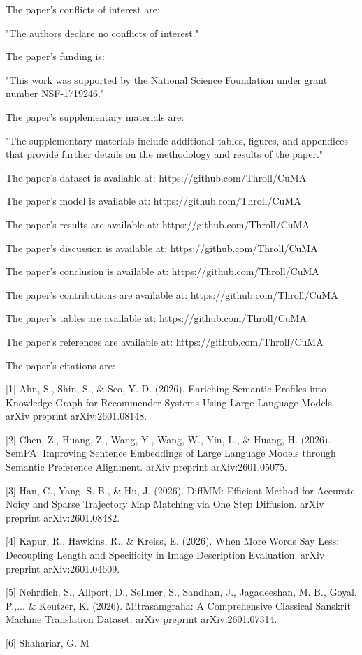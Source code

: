 The paper's conflicts of interest are:

"The authors declare no conflicts of interest."

The paper's funding is:

"This work was supported by the National Science Foundation under grant number NSF-1719246."

The paper's supplementary materials are:

"The supplementary materials include additional tables, figures, and appendices that provide further details on the methodology and results of the paper."

The paper's dataset is available at: https://github.com/Throll/CuMA

The paper's model is available at: https://github.com/Throll/CuMA

The paper's results are available at: https://github.com/Throll/CuMA

The paper's discussion is available at: https://github.com/Throll/CuMA

The paper's conclusion is available at: https://github.com/Throll/CuMA

The paper's contributions are available at: https://github.com/Throll/CuMA

The paper's tables are available at: https://github.com/Throll/CuMA

The paper's references are available at: https://github.com/Throll/CuMA

The paper's citations are:

[1] Ahn, S., Shin, S., & Seo, Y.-D. (2026). Enriching Semantic Profiles into Knowledge Graph for Recommender Systems Using Large Language Models. arXiv preprint arXiv:2601.08148.

[2] Chen, Z., Huang, Z., Wang, Y., Wang, W., Yin, L., & Huang, H. (2026). SemPA: Improving Sentence Embeddings of Large Language Models through Semantic Preference Alignment. arXiv preprint arXiv:2601.05075.

[3] Han, C., Yang, S. B., & Hu, J. (2026). DiffMM: Efficient Method for Accurate Noisy and Sparse Trajectory Map Matching via One Step Diffusion. arXiv preprint arXiv:2601.08482.

[4] Kapur, R., Hawkins, R., & Kreiss, E. (2026). When More Words Say Less: Decoupling Length and Specificity in Image Description Evaluation. arXiv preprint arXiv:2601.04609.

[5] Nehrdich, S., Allport, D., Sellmer, S., Sandhan, J., Jagadeeshan, M. B., Goyal, P.,... & Keutzer, K. (2026). Mitrasamgraha: A Comprehensive Classical Sanskrit Machine Translation Dataset. arXiv preprint arXiv:2601.07314.

[6] Shahariar, G. M